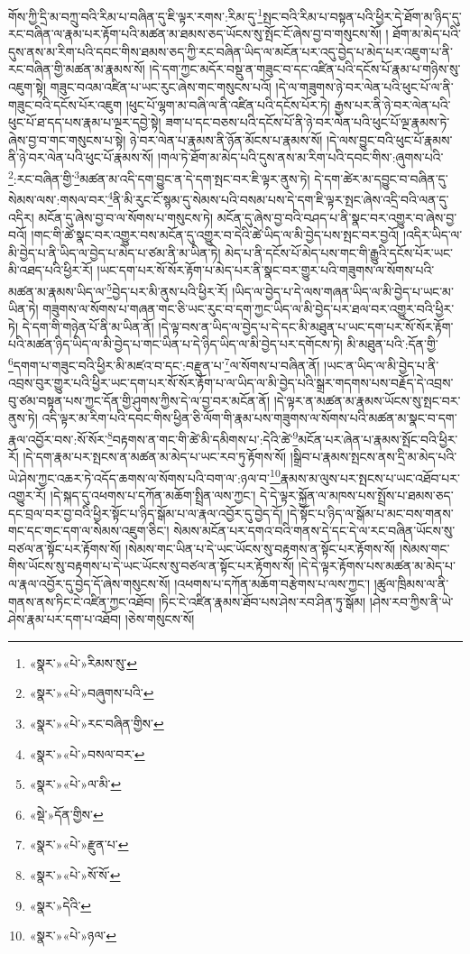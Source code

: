 གོས་ཀྱི་དྲི་མ་བཀྲུ་བའི་རིམ་པ་བཞིན་དུ་ཇི་ལྟར་རགས་:རིམ་དུ་\footnote{«སྣར་»«པེ་»རིམས་སུ་}སྤང་བའི་རིམ་པ་བསྟན་པའི་ཕྱིར་དེ་ཐོག་མ་ཉིད་དུ་རང་བཞིན་ལ་རྣམ་པར་རྟོག་པའི་མཚན་མ་ཐམས་ཅད་ཡོངས་སུ་སྤོང་ངོ་ཞེས་བྱ་བ་གསུངས་སོ། །
ཐོག་མ་མེད་པའི་དུས་ནས་མ་རིག་པའི་དབང་གིས་ཐམས་ཅད་ཀྱི་རང་བཞིན་ཡིད་ལ་མངོན་པར་འདུ་བྱེད་པ་མེད་པར་འཇུག་པ་ནི་རང་བཞིན་གྱི་མཚན་མ་རྣམས་སོ། །དེ་དག་ཀྱང་མདོར་བསྡུ་ན་གཟུང་བ་དང་འཛིན་པའི་དངོས་པོ་རྣམ་པ་གཉིས་སུ་འཇུག་སྟེ། གཟུང་བའམ་འཛིན་པ་ཡང་རུང་ཞེས་གང་གསུངས་པའོ། །དེ་ལ་གཟུགས་ཉེ་བར་ལེན་པའི་ཕུང་པོ་ལ་ནི་གཟུང་བའི་དངོས་པོར་འཇུག །ཕུང་པོ་ལྷག་མ་བཞི་ལ་ནི་འཛིན་པའི་དངོས་པོར་ཏེ། རྒྱས་པར་ནི་ཉེ་བར་ལེན་པའི་ཕུང་པོ་ཐ་དད་པས་རྣམ་པ་ལྔར་དབྱེ་སྟེ། ཟག་པ་དང་བཅས་པའི་དངོས་པོ་ནི་ཉེ་བར་ལེན་པའི་ཕུང་པོ་ལྔ་རྣམས་ཏེ་ཞེས་བྱ་བ་གང་གསུངས་པ་སྟེ། ཉེ་བར་ལེན་པ་རྣམས་ནི་ཉོན་མོངས་པ་རྣམས་སོ། །དེ་ལས་བྱུང་བའི་ཕུང་པོ་རྣམས་ནི་ཉེ་བར་ལེན་པའི་ཕུང་པོ་རྣམས་སོ། །གལ་ཏེ་ཐོག་མ་མེད་པའི་དུས་ནས་མ་རིག་པའི་དབང་གིས་:ཞུགས་པའི་\footnote{«སྣར་»«པེ་»བཞུགས་པའི་}:རང་བཞིན་གྱི་\footnote{«སྣར་»«པེ་»རང་བཞིན་གྱིས་}མཚན་མ་འདི་དག་བྱུང་ན་དེ་དག་སྤང་བར་ཇི་ལྟར་ནུས་ཏེ། དེ་དག་ཚེར་མ་དབྱུང་བ་བཞིན་དུ་སེམས་ལས་:གསལ་བར་\footnote{«སྣར་»«པེ་»བསལ་བར་}ནི་མི་རུང་ངོ་སྙམ་དུ་སེམས་པའི་བསམ་པས་དེ་དག་ཇི་ལྟར་སྤང་ཞེས་འདྲི་བའི་ལན་དུ་འདིར། མངོན་དུ་ཞེས་བྱ་བ་ལ་སོགས་པ་གསུངས་ཏེ། མངོན་དུ་ཞེས་བྱ་བའི་བཤད་པ་ནི་སྣང་བར་འགྱུར་བ་ཞེས་བྱ་བའོ། །གང་གི་ཚེ་སྣང་བར་འགྱུར་བས་མངོན་དུ་འགྱུར་བ་དེའི་ཚེ་ཡིད་ལ་མི་བྱེད་པས་སྤང་བར་བྱའོ། །འདིར་ཡིད་ལ་མི་བྱེད་པ་ནི་ཡིད་ལ་བྱེད་པ་མེད་པ་ཙམ་ནི་མ་ཡིན་ཏེ། མེད་པ་ནི་དངོས་པོ་མེད་པས་གང་གི་རྒྱུའི་དངོས་པོར་ཡང་མི་འཐད་པའི་ཕྱིར་རོ། །ཡང་དག་པར་སོ་སོར་རྟོག་པ་མེད་པར་ནི་སྣང་བར་གྱུར་པའི་གཟུགས་ལ་སོགས་པའི་མཚན་མ་རྣམས་ཡིད་ལ་\footnote{«སྣར་»«པེ་»ལ་མི་}བྱེད་པར་མི་ནུས་པའི་ཕྱིར་རོ། །ཡིད་ལ་བྱེད་པ་དེ་ལས་གཞན་ཡིད་ལ་མི་བྱེད་པ་ཡང་མ་ཡིན་ཏེ། གཟུགས་ལ་སོགས་པ་གཞན་གང་ཅི་ཡང་རུང་བ་དག་ཀྱང་ཡིད་ལ་མི་བྱེད་པར་ཐལ་བར་འགྱུར་བའི་ཕྱིར་ཏེ། དེ་དག་གི་གཉེན་པོ་ནི་མ་ཡིན་ནོ། །དེ་ལྟ་བས་ན་ཡིད་ལ་བྱེད་པ་དེ་དང་མི་མཐུན་པ་ཡང་དག་པར་སོ་སོར་རྟོག་པའི་མཚན་ཉིད་ཡིད་ལ་མི་བྱེད་པ་གང་ཡིན་པ་དེ་ཉིད་ཡིད་ལ་མི་བྱེད་པར་དགོངས་ཏེ། མི་མཐུན་པའི་:དོན་གྱི་\footnote{«སྡེ་»དོན་གྱིས་}དགག་པ་གཟུང་བའི་ཕྱིར་མི་མཛའ་བ་དང་:བརྫུན་པ་\footnote{«སྣར་»«པེ་»རྫུན་པ་}ལ་སོགས་པ་བཞིན་ནོ། །ཡང་ན་ཡིད་ལ་མི་བྱེད་པ་ནི་འབྲས་བུར་གྱུར་པའི་ཕྱིར་ཡང་དག་པར་སོ་སོར་རྟོག་པ་ལ་ཡིད་ལ་མི་བྱེད་པའི་སྒྲར་གདགས་པས་བརྗོད་དེ་འབྲས་བུ་ཙམ་བསྟན་པས་ཀྱང་དོན་གྱི་ཤུགས་ཀྱིས་དེ་ལ་བྱ་བར་མངོན་ནོ། །དེ་ལྟར་ན་མཚན་མ་རྣམས་ཡོངས་སུ་སྤང་བར་ནུས་ཏེ། འདི་ལྟར་མ་རིག་པའི་དབང་གིས་ཕྱིན་ཅི་ལོག་གི་རྣམ་པས་གཟུགས་ལ་སོགས་པའི་མཚན་མ་སྣང་བ་དག་རྣལ་འབྱོར་བས་:སོ་སོར་\footnote{«སྣར་»«པེ་»སོ་སོ་}བརྟགས་ན་གང་གི་ཚེ་མི་དམིགས་པ་:དེའི་ཚེ་\footnote{«སྣར་»དེའི་}མངོན་པར་ཞེན་པ་རྣམས་སྤོང་བའི་ཕྱིར་རོ། །དེ་དག་རྣམ་པར་སྤངས་ན་མཚན་མ་མེད་པ་ཡང་རབ་ཏུ་རྟོགས་སོ། །སྒྲིབ་པ་རྣམས་སྤངས་ནས་དྲི་མ་མེད་པའི་ཡེ་ཤེས་ཀྱང་འཆར་ཏེ་འདོད་ཆགས་ལ་སོགས་པའི་བག་ལ་:ཉལ་བ་\footnote{«སྣར་»«པེ་»ཉལ་}རྣམས་མ་ལུས་པར་སྤངས་པ་ཡང་འཐོབ་པར་འགྱུར་རོ། །དེ་སྐད་དུ་འཕགས་པ་དཀོན་མཆོག་སྤྲིན་ལས་ཀྱང་། དེ་དེ་ལྟར་སྐྱོན་ལ་མཁས་པས་སྤྲོས་པ་ཐམས་ཅད་དང་བྲལ་བར་བྱ་བའི་ཕྱིར་སྟོང་པ་ཉིད་སྒོམ་པ་ལ་རྣལ་འབྱོར་དུ་བྱེད་དོ། །དེ་སྟོང་པ་ཉིད་ལ་སྒོམ་པ་མང་བས་གནས་གང་དང་གང་དག་ལ་སེམས་འཇུག་ཅིང་། སེམས་མངོན་པར་དགའ་བའི་གནས་དེ་དང་དེ་ལ་རང་བཞིན་ཡོངས་སུ་བཙལ་ན་སྟོང་པར་རྟོགས་སོ། །སེམས་གང་ཡིན་པ་དེ་ཡང་ཡོངས་སུ་བརྟགས་ན་སྟོང་པར་རྟོགས་སོ། །སེམས་གང་གིས་ཡོངས་སུ་བརྟགས་པ་དེ་ཡང་ཡོངས་སུ་བཙལ་ན་སྟོང་པར་རྟོགས་སོ། །དེ་དེ་ལྟར་རྟོགས་པས་མཚན་མ་མེད་པ་ལ་རྣལ་འབྱོར་དུ་བྱེད་དོ་ཞེས་གསུངས་སོ། །འཕགས་པ་དཀོན་མཆོག་བརྩེགས་པ་ལས་ཀྱང་། །ཚུལ་ཁྲིམས་ལ་ནི་གནས་ནས་ཏིང་ངེ་འཛིན་ཀྱང་འཐོབ། །ཏིང་ངེ་འཛིན་རྣམས་ཐོབ་པས་ཤེས་རབ་ཤིན་ཏུ་སྒོམ། །ཤེས་རབ་ཀྱིས་ནི་ཡེ་ཤེས་རྣམ་པར་དག་པ་འཐོབ། །ཅེས་གསུངས་སོ། 